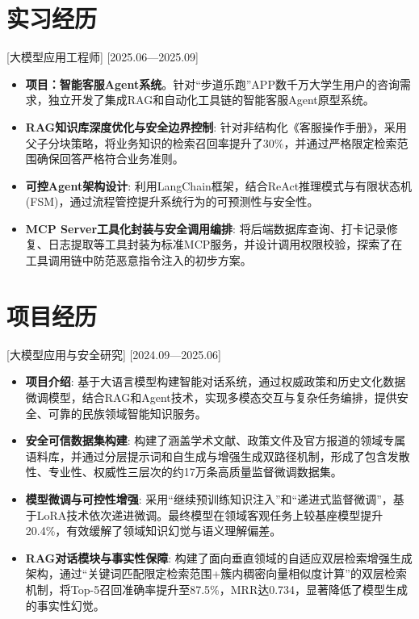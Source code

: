 \documentclass{resume}
\begin{document}
\section{实习经历}

[大模型应用工程师]
[2025.06—2025.09]

\begin{itemize}
  \item \textbf{项目：智能客服Agent系统}。针对“步道乐跑”APP数千万大学生用户的咨询需求，独立开发了集成RAG和自动化工具链的智能客服Agent原型系统。
  \item \textbf{RAG知识库深度优化与安全边界控制}: 针对非结构化《客服操作手册》，采用父子分块策略，将业务知识的检索召回率提升了30\%，并通过严格限定检索范围确保回答严格符合业务准则。
  \item \textbf{可控Agent架构设计}: 利用LangChain框架，结合ReAct推理模式与有限状态机(FSM)，通过流程管控提升系统行为的可预测性与安全性。
  \item \textbf{MCP Server工具化封装与安全调用编排}: 将后端数据库查询、打卡记录修复、日志提取等工具封装为标准MCP服务，并设计调用权限校验，探索了在工具调用链中防范恶意指令注入的初步方案。
\end{itemize}

\section{项目经历}

[大模型应用与安全研究]
[2024.09—2025.06]
\begin{itemize}
  \item \textbf{项目介绍}: 基于大语言模型构建智能对话系统，通过权威政策和历史文化数据微调模型，结合RAG和Agent技术，实现多模态交互与复杂任务编排，提供安全、可靠的民族领域智能知识服务。
  \item \textbf{安全可信数据集构建}: 构建了涵盖学术文献、政策文件及官方报道的领域专属语料库，并通过分层提示词和自生成与增强生成双路径机制，形成了包含发散性、专业性、权威性三层次的约17万条高质量监督微调数据集。
  \item \textbf{模型微调与可控性增强}: 采用“继续预训练知识注入”和“递进式监督微调”，基于LoRA技术依次递进微调。最终模型在领域客观任务上较基座模型提升20.4\%，有效缓解了领域知识幻觉与语义理解偏差。
  \item \textbf{RAG对话模块与事实性保障}: 构建了面向垂直领域的自适应双层检索增强生成架构，通过“关键词匹配限定检索范围+簇内稠密向量相似度计算”的双层检索机制，将Top-5召回准确率提升至87.5\%，MRR达0.734，显著降低了模型生成的事实性幻觉。
\end{itemize}
\end{document}
